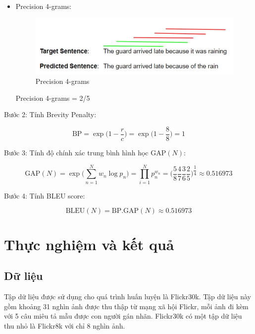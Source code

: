 \documentclass[14pt, a4paper]{article}
\numberwithin{equation}{section}
\numberwithin{algorithm}{section}
\numberwithin{figure}{section}
\numberwithin{dl}{section}
\numberwithin{md}{section}
\numberwithin{bd}{section}
\numberwithin{dn}{section}
\numberwithin{hq}{section}
\begin{document}
\begin{itemize}
        \item Precision 4-grams:
        
        \begin{figure}[h!] \centering

            \includegraphics[scale=0.8]{BLEU_4.jpg}
            \caption{Precision 4-grams}

        \end{figure}
        
        Precision 4-grams = 2/5

    \end{itemize}

    Bước 2: Tính Brevity Penalty:

    \begin{equation}
        \mathrm{BP}=\exp\Big(1-\dfrac{r}{c}\Big)=\exp\Big(1-\dfrac{8}{8}\Big)=1
    \end{equation}

    Bước 3: Tính độ chính xác trung bình hình học $\mathrm{GAP}(N)$:

    \begin{equation}
        \mathrm{GAP}(N)=\exp\big( \sum_{n=1}^N w_n \log p_n \big)=\prod_{i=1}^N p_n^{w_n}=\Big(\dfrac{5}{8}\dfrac{4}{7}\dfrac{3}{6}\dfrac{2}{5}\Big)^{\dfrac{1}{4}}\approx 0.516973
    \end{equation}

    Bước 4: Tính BLEU score:

    \begin{equation}
        \mathrm{BLEU}(N)=\mathrm{BP}.\mathrm{GAP}(N)\approx 0.516973
    \end{equation}

    \section{Thực nghiệm và kết quả}

    \subsection{Dữ liệu}

    Tập dữ liệu được sử dụng cho quá trình huấn luyện là Flickr30k.
    Tập dữ liệu này gồm khoảng 31 nghìn ảnh được thu thập từ mạng xã hội Flickr, mỗi ảnh đi kèm với 5 câu miêu tả mẫu được con người gán nhãn.
    Flickr30k có một tập dữ liệu thu nhỏ là Flickr8k với chỉ 8 nghìn ảnh.
\end{document}
